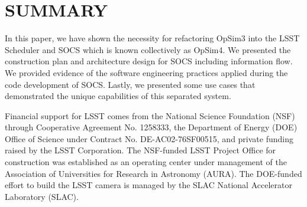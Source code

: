 \documentclass[]{spie}  %
\begin{document}
\section{SUMMARY}

In this paper, we have shown the necessity for refactoring OpSim3 into the LSST Scheduler and SOCS which is known collectively as OpSim4. We presented the construction plan and architecture design for SOCS including information flow. We provided evidence of the software engineering practices applied during the code development of SOCS. Lastly, we presented some use cases that demonstrated the unique capabilities of this separated system. 

\acknowledgments %

Financial support for LSST comes from the National Science Foundation (NSF) through Cooperative Agreement No. 1258333, the Department of Energy (DOE) Office of Science under Contract No. DE-AC02-76SF00515, and private funding raised by the LSST Corporation. The NSF-funded LSST Project Office for construction was established as an operating center under management of the Association of Universities for Research in Astronomy (AURA).  The DOE-funded effort to build the LSST camera is managed by the SLAC National Accelerator Laboratory (SLAC).    

\end{document}
